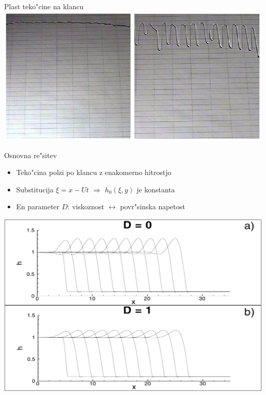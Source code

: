 \documentclass{beamer}
\begin{document}
\begin{frame}{Plast teko"cine na klancu}
 \includegraphics[width=\textwidth]{./Slike/film-slika}
\end{frame}

\begin{frame}{Osnovna re"sitev}
 \begin{itemize}
  \item Teko"cina polzi po klancu z enakomerno hitrostjo
  \item Substitucija $\xi = x - Ut$ $\Rightarrow$ $h_0(\xi, y)$ je konstanta
  \item En parameter $D$: viskoznost $\leftrightarrow$ povr"sinska napetost
 \end{itemize}
 \begin{center}
 \includegraphics[width=.7\textwidth]{./Slike/film-osnovna-resitev}
 \end{center}
\end{frame}
\end{document}
